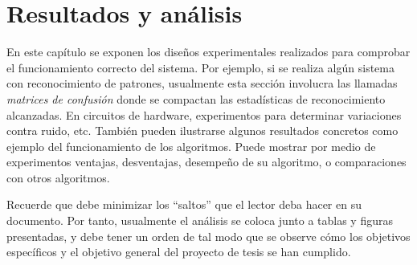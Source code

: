 \chapter{Resultados y análisis}

En este capítulo se exponen los diseños experimentales realizados para
comprobar el funcionamiento correcto del sistema. Por ejemplo, si se
realiza algún sistema con reconocimiento de patrones, usualmente esta
sección involucra las llamadas \emph{matrices de confusión} donde se
compactan las estadísticas de reconocimiento alcanzadas. En circuitos
de hardware, experimentos para determinar variaciones contra ruido,
etc. También pueden ilustrarse algunos resultados concretos como
ejemplo del funcionamiento de los algoritmos. Puede mostrar por medio
de experimentos ventajas, desventajas, desempeño de su algoritmo, o
comparaciones con otros algoritmos.

Recuerde que debe minimizar los ``saltos'' que el lector deba hacer en
su documento. Por tanto, usualmente el análisis se coloca junto a
tablas y figuras presentadas, y debe tener un orden de tal modo que se
observe cómo los objetivos específicos y el objetivo general del
proyecto de tesis se han cumplido.
